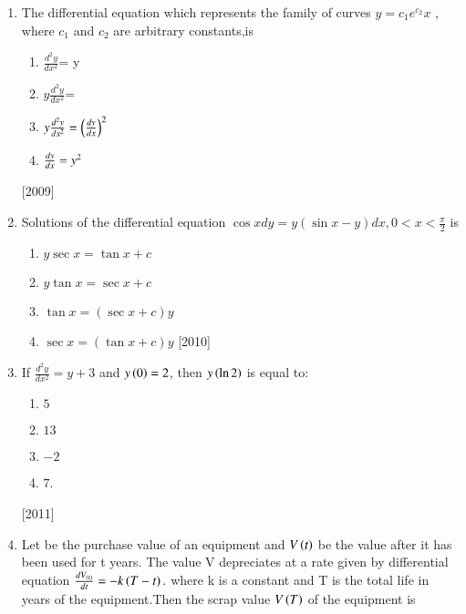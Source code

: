 \documentclass[journal]{IEEEtran}
\begin{document}
\begin{enumerate}
\item The differential equation which represents the family of curves $y= c{_1}e^{c_2}x$ , where $c{_1}$ and $c{_2}$ are arbitrary constants,is
\begin{multicols}{2}
 \begin{enumerate}
    \item $\frac{d^{2}y}{dx^{2}}$= y

    \item $y\frac{d^{2}y}{dx^{2}}$= 

    \item $y\frac{d^{2}y}{dx^{2}}=\left(\frac{d{y}}{d{x}}\right)^2$
    
    \item $\frac{d{y}}{d{x}}=y^2$
 \end{enumerate}
\end{multicols}
\hfill
{[2009]}
\item Solutions of the differential equation $\cos{x} d{y}=y(\sin{x}-y)d{x},0<x<\frac{\pi}{2}$ is
\begin{multicols}{2}
 \begin{enumerate}
    
    \item $ y\sec{x}=\tan{x}+c$
    \item $y\tan{x}=\sec{x}+c$
    \item $\tan{x}=(\sec{x}+c)y$
    \item $\sec{x}=(\tan{x}+c)y$
\hfill
{{[2010]}}




    
 \end{enumerate}
\end{multicols}

\item If $\frac{d^{2}y}{dx^{2}}=y+3$ and $y\left(0\right)=2$, then $y\left(\ln{2}\right)$ is equal to:
\begin{multicols}{2}
 \begin{enumerate}
    \item $ 5 $
    \item $ 13 $
    \item $ -2 $
    \item $ 7 $.
 \end {enumerate}
\end{multicols}
\hfill
{{[2011]}}



\item Let  be the purchase value of an equipment and $V\left(t\right)$ be the value after it has been used for t years. The value V depreciates at a rate given by differential equation $\frac{d{V_{\left(t\right)}}}{d{t}}=-k\left(T-t\right).$ where k is a constant and T is the total life in years of the equipment.Then the scrap value $V\left(T\right)$ of the equipment is 
\begin{multicols}{2}
 \begin {enumerate}


\end{enumerate}
\end{multicols}
\end{enumerate}
\end{document}
